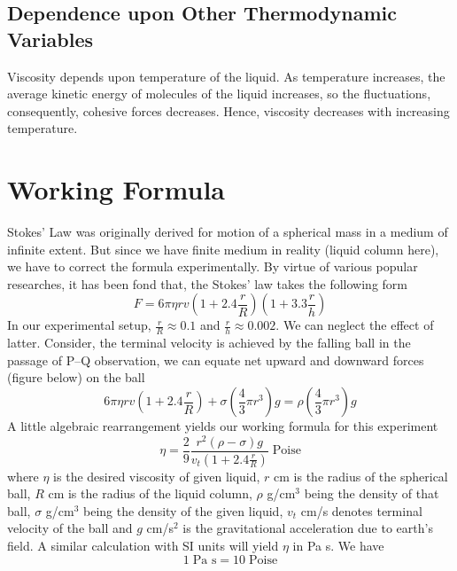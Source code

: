 \documentclass[11pt, a4paper, abstract=true]{scrartcl}
\begin{document}
\subsection{Dependence upon Other Thermodynamic Variables}
Viscosity depends upon temperature of the liquid. As temperature increases, the average kinetic energy of molecules of the liquid  increases, so the fluctuations, consequently,  cohesive forces decreases. Hence, viscosity decreases with increasing temperature.

\section{Working Formula}
Stokes' Law was originally derived for motion of a  spherical mass in a medium of infinite extent. But since we have finite medium in reality (liquid column here), we have to correct the formula experimentally. By virtue of various popular researches, it has been fond that, the Stokes' law takes the following form 
\begin{equation}
    F = 6 \pi \eta r v \left(1 + 2.4 \frac{r}{R}\right)\left(1 + 3.3 \frac{r}{h}\right)
\end{equation}
In our experimental setup, \(\frac{r}{R} \approx 0.1\) and \(\frac{r}{h} \approx 0.002\). We can neglect the effect of latter. Consider, the terminal velocity is achieved by the falling ball in the passage of P–Q observation, we can equate net upward and downward forces (figure below) on the ball \[6 \pi \eta r v \left(1 + 2.4 \frac{r}{R}\right) + \sigma \left(\frac{4}{3}\pi r^3\right) g = \rho \left(\frac{4}{3}\pi r^3\right) g\] A little algebraic rearrangement yields our working formula for this experiment
\begin{equation}
    \eta = \frac{2}{9} \frac{r^2(\rho - \sigma)g}{v_t (1 + 2.4\frac{r}{R})} \; \text{Poise}
    \label{eq:eq5}
\end{equation}
where \(\eta\) is the desired viscosity of given liquid, \(r\) cm is the radius of the spherical ball, \(R\) cm is the radius of the liquid column, \(\rho\) g/cm\(^3\) being the density of that ball, \(\sigma\) g/cm\(^3\) being the density of the given liquid, \(v_t\) cm/s denotes terminal velocity of the ball and \(g\) cm/s\(^2\) is the gravitational acceleration due to earth's field. A similar calculation with SI units will yield \(\eta\) in Pa s. We have \[1 \; \text{Pa s} = 10  \; \text{Poise}\]
\end{document}
